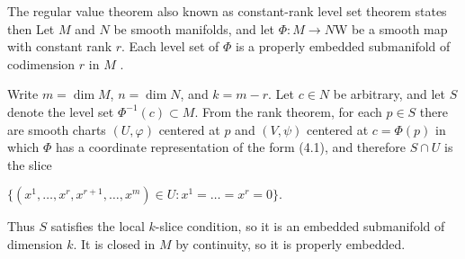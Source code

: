 The regular value theorem also known as constant-rank level set theorem states then
Let \( M \) and \( N \) be smooth manifolds, and let \( \Phi : M \to N \)W  be a smooth map with constant rank \( r \). 
Each level set of \( \Phi \) is a properly embedded submanifold of codimension \( r \) in \( M \) .

Write \(m = \dim M\), \(n = \dim N\), and \(k = m - r\). Let \(c \in N\) be arbitrary, and let \(S\) denote the level set \(\Phi^{-1}(c) \subset M\). From the rank theorem, for each \(p \in S\) there are smooth charts \((U, \varphi)\) centered at \(p\) and \((V, \psi)\) centered at \(c = \Phi(p)\) in which \(\Phi\) has a coordinate representation of the form (4.1), and therefore \(S \cap U\) is the slice   
 
\(\{(x^1, \dots, x^r, x^{r+1}, \dots, x^m) \in U : x^1 = \dots = x^r = 0\}.\)

Thus \(S\) satisfies the local \(k\)-slice condition, so it is an embedded submanifold of dimension \(k\). It is closed in \(M\) by continuity, so it is properly embedded.
